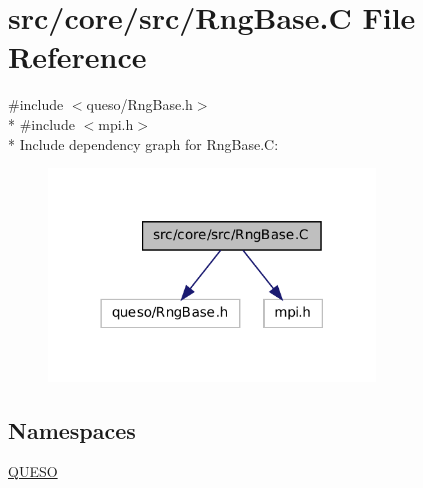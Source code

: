 \hypertarget{_rng_base_8_c}{\section{src/core/src/\-Rng\-Base.C File Reference}
\label{_rng_base_8_c}
}
{\ttfamily \#include $<$queso/\-Rng\-Base.\-h$>$}\\*
{\ttfamily \#include $<$mpi.\-h$>$}\\*
Include dependency graph for Rng\-Base.\-C\-:
\nopagebreak
\begin{figure}[H]
\begin{center}
\leavevmode
\includegraphics[width=246pt]{_rng_base_8_c__incl}
\end{center}
\end{figure}
\subsection*{Namespaces}
\begin{DoxyCompactItemize}
\item 
\hyperlink{namespace_q_u_e_s_o}{Q\-U\-E\-S\-O}
\end{DoxyCompactItemize}
